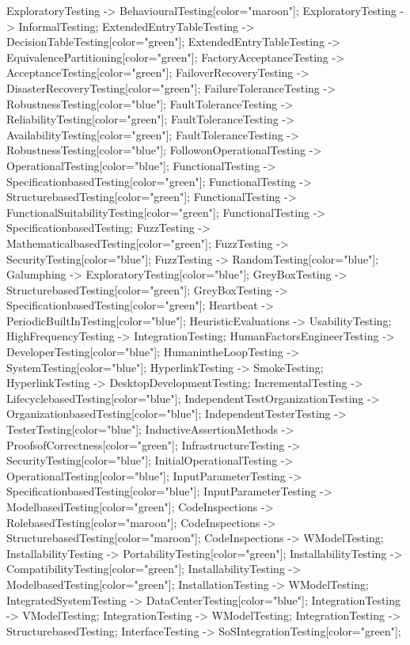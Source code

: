 \documentclass{article}
\begin{document}
{ExploratoryTesting -> BehaviouralTesting[color="maroon"];
ExploratoryTesting -> InformalTesting;
ExtendedEntryTableTesting -> DecisionTableTesting[color="green"];
ExtendedEntryTableTesting -> EquivalencePartitioning[color="green"];
FactoryAcceptanceTesting -> AcceptanceTesting[color="green"];
FailoverRecoveryTesting -> DisasterRecoveryTesting[color="green"];
FailureToleranceTesting -> RobustnessTesting[color="blue"];
FaultToleranceTesting -> ReliabilityTesting[color="green"];
FaultToleranceTesting -> AvailabilityTesting[color="green"];
FaultToleranceTesting -> RobustnessTesting[color="blue"];
FollowonOperationalTesting -> OperationalTesting[color="blue"];
FunctionalTesting -> SpecificationbasedTesting[color="green"];
FunctionalTesting -> StructurebasedTesting[color="green"];
FunctionalTesting -> FunctionalSuitabilityTesting[color="green"];
FunctionalTesting -> SpecificationbasedTesting;
FuzzTesting -> MathematicalbasedTesting[color="green"];
FuzzTesting -> SecurityTesting[color="blue"];
FuzzTesting -> RandomTesting[color="blue"];
Galumphing -> ExploratoryTesting[color="blue"];
GreyBoxTesting -> StructurebasedTesting[color="green"];
GreyBoxTesting -> SpecificationbasedTesting[color="green"];
Heartbeat -> PeriodicBuiltInTesting[color="blue"];
HeuristicEvaluations -> UsabilityTesting;
HighFrequencyTesting -> IntegrationTesting;
HumanFactorsEngineerTesting -> DeveloperTesting[color="blue"];
HumanintheLoopTesting -> SystemTesting[color="blue"];
HyperlinkTesting -> SmokeTesting;
HyperlinkTesting -> DesktopDevelopmentTesting;
IncrementalTesting -> LifecyclebasedTesting[color="blue"];
IndependentTestOrganizationTesting -> OrganizationbasedTesting[color="blue"];
IndependentTesterTesting -> TesterTesting[color="blue"];
InductiveAssertionMethods -> ProofsofCorrectness[color="green"];
InfrastructureTesting -> SecurityTesting[color="blue"];
InitialOperationalTesting -> OperationalTesting[color="blue"];
InputParameterTesting -> SpecificationbasedTesting[color="blue"];
InputParameterTesting -> ModelbasedTesting[color="green"];
CodeInspections -> RolebasedTesting[color="maroon"];
CodeInspections -> StructurebasedTesting[color="maroon"];
CodeInspections -> WModelTesting;
InstallabilityTesting -> PortabilityTesting[color="green"];
InstallabilityTesting -> CompatibilityTesting[color="green"];
InstallabilityTesting -> ModelbasedTesting[color="green"];
InstallationTesting -> WModelTesting;
IntegratedSystemTesting -> DataCenterTesting[color="blue"];
IntegrationTesting -> VModelTesting;
IntegrationTesting -> WModelTesting;
IntegrationTesting -> StructurebasedTesting;
InterfaceTesting -> SoSIntegrationTesting[color="green"];
}
\end{document}
